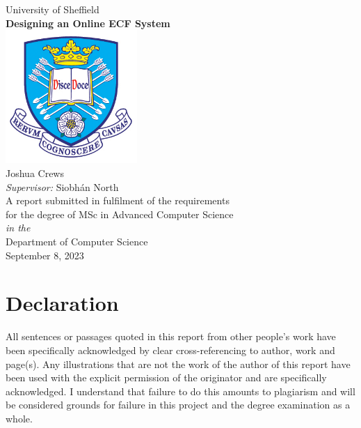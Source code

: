 \documentclass[11pt,oneside]{book}
\begin{document}
\frontmatter

\begin{titlepage}

\begin{center}
{\LARGE University of Sheffield}\\[1.5cm]
\linespread{1.2}\huge {\bfseries Designing an Online ECF System}\\[1.5cm]
\linespread{1}
\includegraphics[width=5cm]{images/tuoslogo.png}\\[1cm]
{\Large Joshua Crews}\\[1cm]
{\large \emph{Supervisor:} Siobhán North}\\[1cm]
\large A report submitted in fulfilment of the requirements\\ for the degree of MSc in Advanced Computer Science\\[0.3cm]
\textit{in the}\\[0.3cm]
Department of Computer Science\\[2cm]
September 8, 2023
\end{center}

\end{titlepage}


\newpage
\chapter*{\Large Declaration}


All sentences or passages quoted in this report from other people's work have been specifically acknowledged by clear cross-referencing to author, work and page(s). Any illustrations that are not the work of the author of this report have been used with the explicit permission of the originator and are specifically acknowledged. I understand that failure to do this amounts to plagiarism and will be considered grounds for failure in this project and the degree examination as a whole.\\[1cm]
\end{document}
